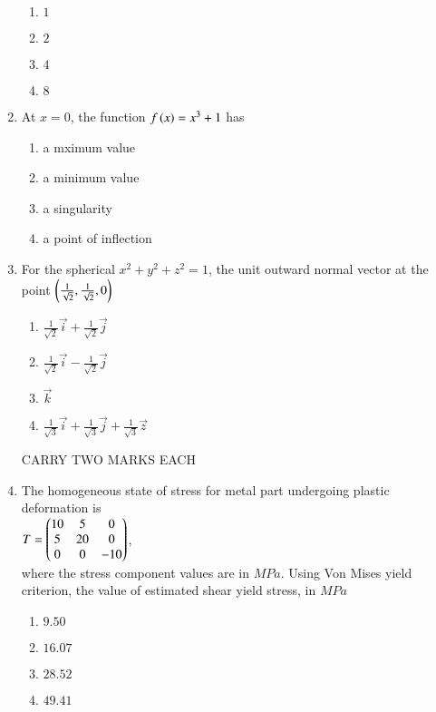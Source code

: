 \documentclass[journal]{IEEEtran}
\begin{document}
\begin{enumerate}
    \begin{enumerate}
        \item $1$
        \item $2$
        \item $4$
        \item $8$
    \end{enumerate}
    \item At $x=0$, the function $f\left(x\right)=x^3+1$ has
    \begin{enumerate}
        \item a mximum value
        \item a minimum value 
        \item a singularity
        \item a point of inflection
    \end{enumerate}
    \item For the spherical $x^2+y^2+z^2=1$, the unit outward normal vector at the point $\left(\frac{1}{\sqrt{2}},\frac{1}{\sqrt{2}},0\right)$
    \begin{enumerate}
        \item $\frac{1}{\sqrt{2}}\Vec{i}+\frac{1}{\sqrt{2}}\Vec{j}$
        \item $\frac{1}{\sqrt{2}}\Vec{i}-\frac{1}{\sqrt{2}}\Vec{j}$
        \item $\Vec{
        k}$
        \item $\frac{1}{\sqrt{3}}\Vec{i}+\frac{1}{\sqrt{3}}\Vec{j}+\frac{1}{\sqrt{3}}\Vec{z}$
    \end{enumerate}
    CARRY TWO MARKS EACH
    \item The homogeneous state of stress for metal part undergoing plastic deformation is\\
    $T=\begin{pmatrix}10&5&0\\5&20&0\\0&0&-10\end{pmatrix}$,\\
    where the stress component values are in $MPa$. Using Von Mises yield criterion, the value of estimated shear yield stress, in $MPa$
    \begin{enumerate}
        \item $9.50$
        \item $16.07$
        \item $28.52$
        \item $49.41$
    \end{enumerate}
\end{enumerate}
\end{document}
